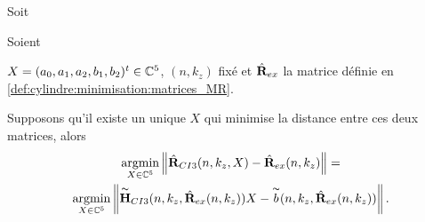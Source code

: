     \begin{prop}
      Soit
\begin{REM}
  Soient
\end{REM} 
       \(X = (a_0,a_1,a_2,b_1,b_2)^t \in \mathbb C^5\), \((n,k_z)\) fixé et \(\hat{\mathbf{R}}_{ex}\) la matrice définie en \ref{def:cylindre:minimisation:matrices_MR}.

      Supposons qu'il existe un unique \(X\) qui minimise la distance entre ces deux matrices, alors
      \begin{multline*}
        {\underset{X\in\mathbb C^5}{\operatorname{argmin}}} \left\lVert\hat{\mathbf{R}}_{CI3}(n,k_z,X) - \hat{\mathbf{R}}_{ex}(n,k_z)\right\rVert =
        \\
        {\underset{X\in\mathbb C^5}{\operatorname{argmin}}} \left\lVert\overset{\thicksim}{\mathbf{H}}_{CI3}(n,k_z,\hat{\mathbf{R}}_{ex}(n,k_z))X - \overset{\thicksim}{b}(n,k_z,\hat{\mathbf{R}}_{ex}(n,k_z))\right\rVert.
      \end{multline*}
    \end{prop}

